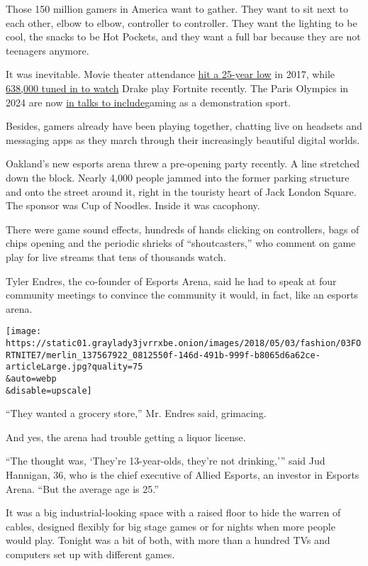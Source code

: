Those 150 million gamers in America want to gather. They want to sit
next to each other, elbow to elbow, controller to controller. They want
the lighting to be cool, the snacks to be Hot Pockets, and they want a
full bar because they are not teenagers anymore.

It was inevitable. Movie theater attendance
\href{https://www.theverge.com/2018/1/3/16844662/movie-theater-attendance-2017-low-netflix-streaming}{hit
a 25-year low} in 2017, while
\href{https://www.theverge.com/2018/3/15/17123424/ninja-drake-fortnite-twitch-stream-record-travis-scott-juju}{638,000
tuned in to watch} Drake play Fortnite recently. The Paris Olympics in
2024 are now \href{https://www.bbc.com/sport/olympics/43893891}{in talks
to include}gaming as a demonstration sport.

Besides, gamers already have been playing together, chatting live on
headsets and messaging apps as they march through their increasingly
beautiful digital worlds.

Oakland's new esports arena threw a pre-opening party recently. A line
stretched down the block. Nearly 4,000 people jammed into the former
parking structure and onto the street around it, right in the touristy
heart of Jack London Square. The sponsor was Cup of Noodles. Inside it
was cacophony.

There were game sound effects, hundreds of hands clicking on
controllers, bags of chips opening and the periodic shrieks of
``shoutcasters,'' who comment on game play for live streams that tens of
thousands watch.

Tyler Endres, the co-founder of Esports Arena, said he had to speak at
four community meetings to convince the community it would, in fact,
like an esports arena.

\texttt{[image: https://static01.graylady3jvrrxbe.onion/images/2018/05/03/fashion/03FORTNITE7/merlin\_137567922\_0812550f-146d-491b-999f-b8065d6a62ce-articleLarge.jpg?quality=75\\\&auto=webp\\\&disable=upscale]}

``They wanted a grocery store,'' Mr. Endres said, grimacing.

And yes, the arena had trouble getting a liquor license.

``The thought was, `They're 13-year-olds, they're not drinking,''' said
Jud Hannigan, 36, who is the chief executive of Allied Esports, an
investor in Esports Arena. ``But the average age is 25.''

It was a big industrial-looking space with a raised floor to hide the
warren of cables, designed flexibly for big stage games or for nights
when more people would play. Tonight was a bit of both, with more than a
hundred TVs and computers set up with different games.

